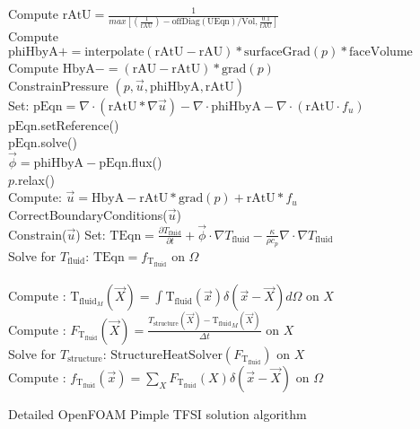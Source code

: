 \documentclass[10pt]{article} %
\begin{document}
\begin{algorithm}[H]
{{{				
				{
					Compute $\text{rAtU} =  \frac{1}{max\left[(\frac{1}{\text{rAU}}) - \text{offDiag}(\text{UEqn})/\text{Vol} , \frac{0.1}{\text{rAU}}\right]} $\\
					Compute $\text{phiHbyA} += \text{interpolate}(\text{rAtU}-\text{rAU})*\text{surfaceGrad}(p)*\text{faceVolume}$\\
					Compute $\text{HbyA} -=  \left(\text{rAU}-\text{rAtU}\right)*\text{grad}(p)$\\
				}
				ConstrainPressure $(p,\vec{u},\text{phiHbyA},\text{rAtU})$\\
				{
					Set: $\text{pEqn} = \nabla \cdot \left(\text{rAtU} * \nabla \vec{u}\right)-\nabla \cdot \text{phiHbyA} - \nabla \cdot \left(\text{rAtU} \cdot f_u\right)$\\
					$\text{pEqn}.$setReference()\\
					$\text{pEqn}.$solve()\\
				}
				{
					$\vec{\phi} = \text{phiHbyA} - \text{pEqn}$.flux()\\
				}
				$p.$relax()\\
				Compute: $\vec{u} = \text{HbyA} - \text{rAtU}*\text{grad}(p) + \text{rAtU}*f_u$\\
				CorrectBoundaryConditions($\vec{u}$)\\
				Constrain($\vec{u}$)
			}
		}
		{
			Set: $\text{TEqn} = \frac{\partial T_{\text{fluid}}}{\partial t} + \vec{\phi} \cdot \nabla T_{\text{fluid}} - \frac{\kappa}{\rho c_p} \nabla \cdot \nabla T_{\text{fluid}}$\\
			Solve for $T_{\text{fluid}}$: $\text{TEqn} = f_{\text{T}_{\text{fluid}}}$ \quad on $\Omega$\\
			\quad \\
			Compute : $\text{T}_{\text{fluid}_M} (\vec{X}) = \int {\text{T}_{\text{fluid}}}(\vec{x}) \delta(\vec{x}-\vec{X}) d \Omega$  \quad on $X$\\
			Compute : $F_{\text{T}_{\text{fluid}}} (\vec{X}) = \frac{T_{\text{structure}} (\vec{X}) - {\text{T}_{\text{fluid}}}_M(\vec{X})}{\Delta t}$ \quad on $X$\\
			Solve for $T_\text{structure}$: $\text{StructureHeatSolver}(F_{\text{T}_{\text{fluid}}})$ \quad on $X$\\
			Compute : $f_{\text{T}_{\text{fluid}}} (\vec{x}) = \sum_{X} F_{\text{T}_{\text{fluid}}} (X) \delta (\vec{x}-\vec{X})$ \quad on $\Omega$\\
		}
	}
	\caption{Detailed OpenFOAM Pimple TFSI solution algorithm}
\end{algorithm}
\end{document}

